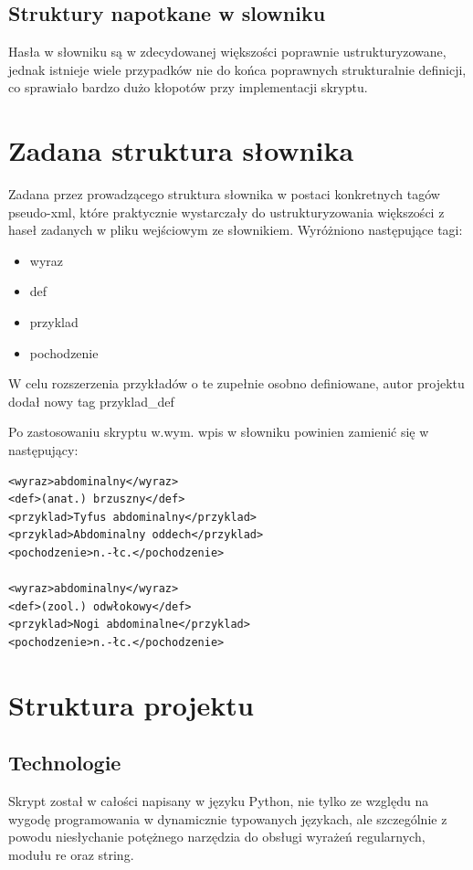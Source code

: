 \documentclass[12pt]{article}
\begin{document}
\subsection{Struktury napotkane w slowniku}
Hasła w słowniku są w zdecydowanej większości poprawnie ustrukturyzowane, jednak
istnieje wiele przypadków nie do końca poprawnych strukturalnie definicji, co 
sprawiało bardzo dużo kłopotów przy implementacji skryptu.

\section{Zadana struktura słownika}
Zadana przez prowadzącego struktura słownika w postaci konkretnych tagów pseudo-xml,
które praktycznie wystarczały do ustrukturyzowania większości z haseł zadanych w pliku
wejściowym ze słownikiem. Wyróżniono następujące tagi:

\begin{itemize}
  \item wyraz
  \item def
  \item przyklad
  \item pochodzenie
\end{itemize}

W celu rozszerzenia przykładów o te zupełnie osobno definiowane, autor projektu dodał
nowy tag przyklad\_def

Po zastosowaniu skryptu w.wym. wpis w słowniku powinien zamienić się w następujący:

\begin{verbatim}
<wyraz>abdominalny</wyraz>
<def>(anat.) brzuszny</def>
<przyklad>Tyfus abdominalny</przyklad>
<przyklad>Abdominalny oddech</przyklad>
<pochodzenie>n.-łc.</pochodzenie>

<wyraz>abdominalny</wyraz>
<def>(zool.) odwłokowy</def>
<przyklad>Nogi abdominalne</przyklad>
<pochodzenie>n.-łc.</pochodzenie>

\end{verbatim}

\section{Struktura projektu}
\subsection{Technologie}
Skrypt został w całości napisany w języku Python, nie tylko ze względu na wygodę programowania
w dynamicznie typowanych językach, ale szczególnie z powodu niesłychanie potężnego narzędzia do obsługi
wyrażeń regularnych, modułu re oraz string.
\end{document}
